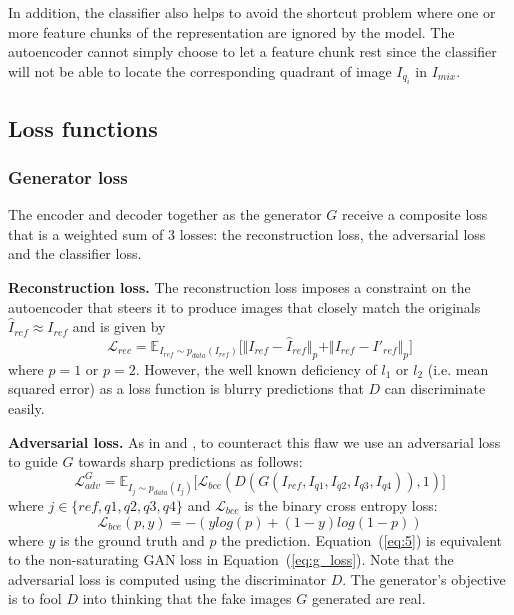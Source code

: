 \documentclass[12pt,a4paper]{article}
\begin{document}
In addition, the classifier also helps to avoid the shortcut problem \cite{ChallengInDisentIFoF} where one or more feature chunks of the representation are ignored by the model. The autoencoder cannot simply choose to let a feature chunk rest since the classifier will not be able to locate the corresponding quadrant of image $I_{q_i}$ in $I_{mix}$.


\subsection{Loss functions}
\subsubsection{Generator loss}
The encoder and decoder together as the generator $G$ receive a composite loss that is a weighted sum of 3 losses: the reconstruction loss, the adversarial loss and the classifier loss. 

\textbf{Reconstruction loss.} The reconstruction loss imposes a constraint on the autoencoder that steers it to produce images that closely match the originals $\hat{I}_{ref} \approx I_{ref}$ and is given by
\begin{equation} \label{eq:4}
    \mathcal{L}_{rec} = \mathbb{E}_{I_{ref}\sim p_{data} (I_{ref})}\big[ \Vert I_{ref} - \hat{I}_{ref} \Vert_p + \Vert I_{ref} - I'_{ref} \Vert_p \big]
\end{equation}
where $p = 1$ or $p = 2$. However, the well known deficiency of $l_1$ or $l_2$ (i.e. mean squared error) as a loss function is blurry predictions that $D$ can discriminate easily. 

\textbf{Adversarial loss.} As in \cite{DisentFacOfVarByMixTh} and \cite{1511.05440}, to counteract this flaw we use an adversarial loss to guide $G$ towards sharp predictions as follows:
\begin{equation} \label{eq:5}
    \mathcal{L}^G_{adv} = \mathbb{E}_{I_{j}\sim p_{data} (I_{j})}\big[ \mathcal{L}_{bce}(D(G(I_{ref},I_{q1},I_{q2},I_{q3},I_{q4})), 1)\big]
\end{equation}
where $j \in \{ref,q1,q2,q3,q4\}$ and $\mathcal{L}_{bce}$ is the binary cross entropy loss:
\begin{equation} \label{eq:6}
    \mathcal{L}_{bce}(p, y) = -(ylog(p) + (1 - y)log(1-p))
\end{equation}
where $y$ is the ground truth and $p$ the prediction. Equation~(\ref{eq:5}) is equivalent to the non-saturating GAN loss in Equation~(\ref{eq:g_loss}). Note that the adversarial loss is computed using the discriminator $D$. The generator's objective is to fool $D$ into thinking that the fake images $G$ generated are real.
\end{document}
